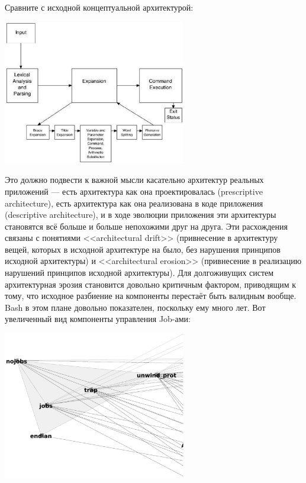 \documentclass[a5paper]{article}
\begin{document}
Сравните с исходной концептуальной архитектурой:

\begin{center}
    \includegraphics[width=0.6\textwidth]{bashArchitecture.png}
\end{center}

Это должно подвести к важной мысли касательно архитектур реальных приложений --- есть архитектура как она проектировалась (prescriptive architecture), есть архитектура как она реализована в коде приложения (descriptive architecture), и в ходе эволюции приложения эти архитектуры становятся всё больше и больше непохожими друг на друга. Эти расхождения связаны с понятиями <<architectural drift>> (привнесение в архитектуру вещей, которых в исходной архитектуре на было, без нарушения принципов исходной архитектуры) и <<architectural erosion>> (привнесение в реализацию нарушений принципов исходной архитектуры). Для долгоживущих систем архитектурная эрозия становится довольно критичным фактором, приводящим к тому, что исходное разбиение на компоненты перестаёт быть валидным вообще. Bash в этом плане довольно показателен, поскольку ему много лет. Вот увеличенный вид компоненты управления Job-ами:

\begin{center}
    \includegraphics[width=0.6\textwidth]{bashJobControl.png}
\end{center}
\end{document}
